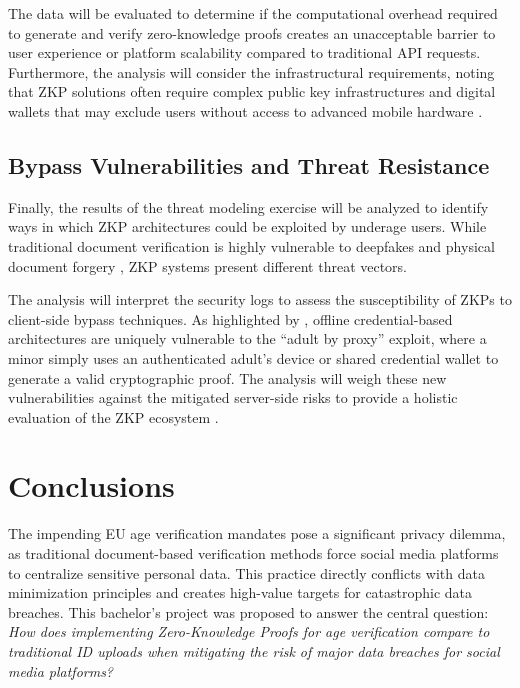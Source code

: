 \documentclass [english]{hogent-article}
\begin{document}
    The data will be evaluated to determine if the computational overhead required to generate and verify zero-knowledge proofs creates an unacceptable barrier to user experience or platform scalability compared to traditional API requests. Furthermore, the analysis will consider the infrastructural requirements, noting that ZKP solutions often require complex public key infrastructures and digital wallets that may exclude users without access to advanced mobile hardware \autocite{EFF2025ZKP, EUCommission2025}.

    \subsection{Bypass Vulnerabilities and Threat Resistance}
    
    Finally, the results of the threat modeling exercise will be analyzed to identify ways in which ZKP architectures could be exploited by underage users. While traditional document verification is highly vulnerable to deepfakes and physical document forgery \autocite{Wodo2025}, ZKP systems present different threat vectors.
 
    The analysis will interpret the security logs to assess the susceptibility of ZKPs to client-side bypass techniques. As highlighted by \textcite{Lueks2026}, offline credential-based architectures are uniquely vulnerable to the ``adult by proxy'' exploit, where a minor simply uses an authenticated adult's device or shared credential wallet to generate a valid cryptographic proof. The analysis will weigh these new vulnerabilities against the mitigated server-side risks to provide a holistic evaluation of the ZKP ecosystem \autocite{EFF2025ZKP}.
    
    \section{Conclusions}%
    
    \label{sec:conclusions}
    
    The impending EU age verification mandates pose a significant privacy dilemma, as traditional document-based verification methods force social media platforms to centralize sensitive personal data. This practice directly conflicts with data minimization principles and creates high-value targets for catastrophic data breaches. This bachelor's project was proposed to answer the central question: \textit{How does implementing Zero-Knowledge Proofs for age verification compare to traditional ID uploads when mitigating the risk of major data breaches for social media platforms?}
    
\end{document}
